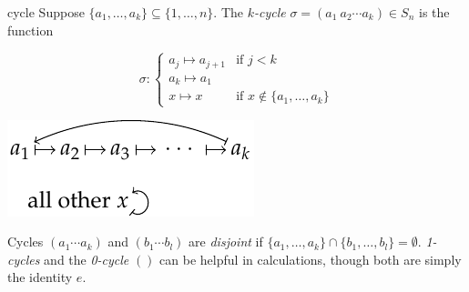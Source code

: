 \begin{defn}{}{cycle}
	Suppose $\{a_1,\ldots,a_k\}\subseteq\{1,\ldots,n\}$. The \emph{$k$-cycle} $\sigma=(a_1\ a_2\cdots a_k)\in S_n$ is the function\par
	\begin{minipage}[t]{0.5\linewidth}\vspace{-12pt}
	\[
		\sigma:
		\begin{cases}
			a_j\mapsto a_{j+1}&\text{if $j<k$}\\
			a_k\mapsto a_1\\
			x\mapsto x&\text{if }x\not\in\{a_1,\ldots,a_k\}
		\end{cases}
	\]
	\end{minipage}
	\hfill
	\begin{minipage}[t]{0.49\linewidth}\vspace{2pt}
		\flushright\includegraphics[scale=0.9]{perm-cycle4}
	\end{minipage}\bigbreak
	Cycles $(a_1\cdots a_k)$ and $(b_1\cdots b_l)$ are \emph{disjoint} if $\{a_1,\ldots,a_k\}\cap\{b_1,\ldots,b_l\}=\emptyset$.\smallbreak
	\emph{1-cycles} and the \emph{0-cycle} $()$ can be helpful in calculations, though both are simply the identity $e$.
\end{defn}

